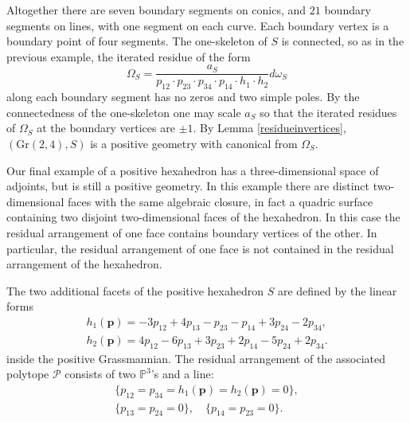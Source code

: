 \documentclass[12pt]{extarticle}
\theoremstyle{definition}
\newenvironment{example}
{\pushQED{\qed}\renewcommand{\qedsymbol}{$\diamond$}\examplex}
{\popQED\endexamplex}
\begin{document}
\begin{example}
Altogether there are seven boundary segments on conics, and $21$ boundary segments on lines, with one segment on each curve.  Each boundary vertex is a boundary point of four segments. The one-skeleton of $S$ is connected, so as in the previous example, the  
iterated residue of the form
$$\Omega_S=\frac{a_S}{p_{12}\cdot p_{23}\cdot p_{34}\cdot p_{14}\cdot h_1\cdot h_2}d\omega_S$$ along each boundary segment has no zeros and two simple poles.  By the connectedness of the one-skeleton one may scale $a_S$ so that the iterated residues of  $\Omega_S$ at the boundary vertices are $\pm 1$.  By Lemma \ref{residueinvertices}, $(\mathrm{Gr}(2,4),S)$  is a positive geometry with canonical from $\Omega_S.$
\end{example}

\begin{example} \label{ex:manyadj}
Our final example of a positive hexahedron has a three-dimensional space of adjoints, but is still a positive geometry.  In this example there are distinct two-dimensional faces with the same algebraic closure, in fact a quadric surface containing two disjoint two-dimensional faces of the hexahedron.  In this case the residual arrangement of one face contains boundary vertices of the other.  In particular, the residual arrangement of one face is not contained in the residual arrangement of the hexahedron.

The two additional facets of the positive hexahedron $S$ are defined by the linear forms
    \begin{gather*}
    h_1(\mathbf{p}) = -3p_{12} + 4p_{13}-p_{23}-p_{14}+3p_{24}-2p_{34},\\
    h_2(\mathbf{p}) = 4p_{12}-6p_{13}+ 3p_{23}+ 2p_{14}-5p_{24} + 2p_{34}.
    \end{gather*}
    inside the positive Grassmannian. 
    The residual arrangement of the associated polytope $\mathcal{P}$ consists of two $\mathbb{P}^3$'s and a line:
    \begin{gather*}
    \{p_{12} = p_{34} = h_1(\mathbf{p}) = h_2(\mathbf{p})= 0\},\\
        \{p_{13} = p_{24} = 0\},\quad \{p_{14} = p_{23} = 0\}.
    \end{gather*}
    

\end{example}
\end{document}
